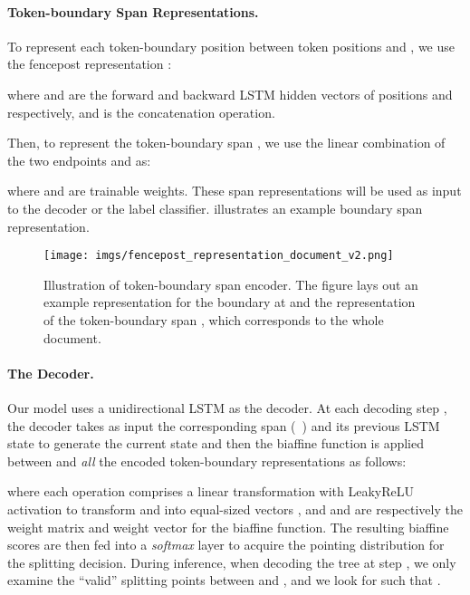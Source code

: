 \paragraph{Token-boundary Span Representations.}

To represent each token-boundary position  between token positions  and , we use the fencepost representation \citep{cross-huang-2016-span}:

where  and  are the forward and backward LSTM hidden vectors of positions  and  respectively, and  is the concatenation operation. 

Then, to represent the token-boundary span , we use the linear combination of the two endpoints  and  as: 

where  and  are trainable weights. These span representations will be used as input to the decoder or the label classifier.  illustrates an example boundary span representation.

\begin{figure}[t!]
\centering
\texttt{[image: imgs/fencepost\_representation\_document\_v2.png]}
\caption{\small Illustration of token-boundary span encoder. The figure lays out an example representation for the boundary at  and the representation of the token-boundary span , which corresponds to the whole document.}
\label{fig:boundary_span_representation}
\end{figure}

\paragraph{The Decoder.}

Our model uses a unidirectional LSTM as the decoder. At each decoding step , the decoder takes as input the corresponding span  (\ie\ ) and its previous LSTM state  to generate the current state  and then the biaffine function \citep{DozatM17} is applied between  and \emph{all} the encoded token-boundary representations  as follows:

\small 

\normalsize

\noindent where each  operation comprises a linear transformation with LeakyReLU activation \citep{Maas13rectifiernonlinearities} to transform  and  into equal-sized vectors , and  and  are respectively the weight matrix and weight vector for the biaffine function. The resulting biaffine scores  are then fed into a \emph{softmax} layer to acquire the pointing distribution  for the splitting decision.
During inference, when decoding the tree at step , we only examine the ``valid'' splitting points between  and , and we look for  such that . 


